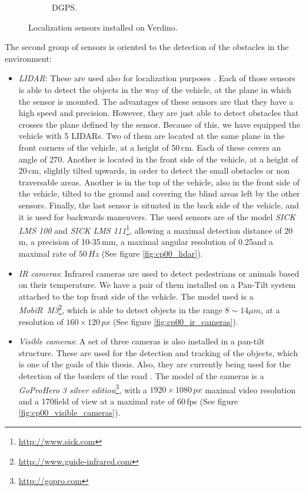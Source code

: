 \begin{figure}[h!]
\begin{subfigure}[b]{0.32\textwidth}
                \caption{\ac{DGPS}.}\label{fig:cp00_dgps}
        \end{subfigure}%
        \caption{Localization sensors installed on Verdino.}\label{fig:cp00_localization_sensors}
\end{figure}

The second group of sensors is oriented to the detection of the obstacles in the environment:

\begin{itemize}
 \item \emph{\acf{LIDAR}}: These are used also for localization purposes \citep{Perea2013mcl}. Each of those sensors is able to detect the objects in the way of the vehicle, at the plane in which the sensor is mounted. The advantages of these sensors are that they have a high speed and precision. However, they are just able to detect obstacles that crosses the plane defined by the sensor. Because of this, we have equipped the vehicle with 5 \acp{LIDAR}. Two of them are located at the same plane in the front corners of the vehicle, at a height of 50\,cm. Each of these covers an angle of 270\textdegree. Another is located in the front side of the vehicle, at a height of 20\,cm, slightly tilted upwards, in order to detect the small obstacles or non traversable areas. Another is in the top of the vehicle, also in the front side of the vehicle, tilted to the ground and covering the blind areas left by the other sensors. Finally, the last sensor is situated in the back side of the vehicle, and it is used for backwards maneuvers. The used sensors are of the model \emph{SICK LMS 100} and \emph{SICK LMS 111}\footnote{\url{http://www.sick.com}}, allowing a maximal detection distance of 20\,m, a precision of 10-35\,mm, a maximal angular resolution of 0.25\textdegree and a maximal rate of $50\,Hz$ (See figure \ref{fig:cp00_lidar}).
 \item \emph{IR cameras}: Infrared cameras are used to detect pedestrians or animals based on their temperature. We have a pair of them installed on a Pan-Tilt system attached to the top front side of the vehicle. The model used is a \emph{MobiR\textregistered~M3}\footnote{\url{http://www.guide-infrared.com}}, which is able to detect objects in the range $8\sim14\mu m$, at a resolution of $160 \times 120\,px$ (See figure \ref{fig:cp00_ir_cameras}).
 \item \emph{Visible cameras}: A set of three cameras is also installed in a pan-tilt structure. These are used for the detection and tracking of the objects, which is one of the goals of this thesis. Also, they are currently being used for the detection of the borders of the road \citep{arnay2009applying}. The model of the cameras is a \emph{GoPro\textregistered Hero 3 silver edition}\footnote{\url{http://gopro.com}}, with a $1920 \times 1080 \, px$ maximal video resolution and a 170\textdegree field of view at a maximal rate of 60\,fps (See figure \ref{fig:cp00_visible_cameras}).
\end{itemize}

